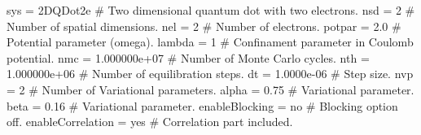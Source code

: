 \begin{src}
sys = 2DQDot2e            # Two dimensional quantum dot with two electrons.
nsd = 2                   # Number of spatial dimensions.
nel = 2                   # Number of electrons.
potpar = 2.0              # Potential parameter (omega).	
lambda = 1                # Confinament parameter in Coulomb potential.
nmc = 1.000000e+07        # Number of Monte Carlo cycles.
nth = 1.000000e+06        # Number of equilibration steps.
dt = 1.0000e-06           # Step size.
nvp = 2                   # Number of Variational parameters.
alpha = 0.75              # Variational parameter.
beta = 0.16               # Variational parameter.
enableBlocking = no       # Blocking option off.
enableCorrelation = yes   # Correlation part included.
\end{src}


